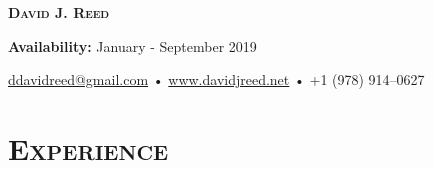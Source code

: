 \documentclass{article}
\begin{document}
\thispagestyle{empty}

\begin{center}
  {\LARGE\textsc{\textbf{David J. Reed}}}
\end{center}

\begin{center}
  \textbf{Availability:}
  January - September 2019
\end{center}

\begin{center}
  \href{mailto:ddavidreed@gmail.com}{ddavidreed@gmail.com} • \href{http://www.davidjreed.net/}{www.davidjreed.net} • +1 (978) 914--0627 \\
  \hrulefill
\end{center}


\section*{\textsc{Experience}}
\end{document}
